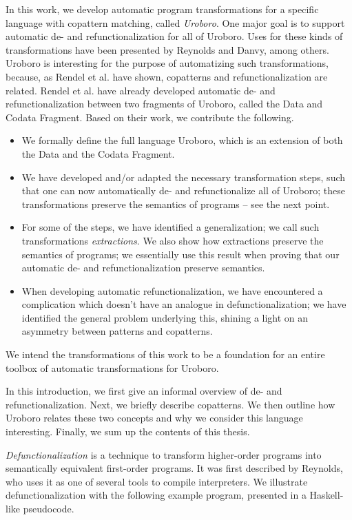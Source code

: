 In this work, we develop automatic program transformations for a specific language with copattern matching, called \textit{Uroboro}. One major goal is to support automatic de- and refunctionalization for all of Uroboro. Uses for these kinds of transformations have been presented by Reynolds and Danvy, among others. Uroboro is interesting for the purpose of automatizing such transformations, because, as Rendel et al.\cite{rendel15automatic} have shown, copatterns and refunctionalization are related. Rendel et al. have already developed automatic de- and refunctionalization between two fragments of Uroboro, called the Data and Codata Fragment. Based on their work, we contribute the following.
\begin{itemize}
\item We formally define the full language Uroboro, which is an extension of both the Data and the Codata Fragment.

\item We have developed and/or adapted the necessary transformation steps, such that one can now automatically de- and refunctionalize all of Uroboro; these transformations preserve the semantics of programs -- see the next point.

\item For some of the steps, we have identified a generalization; we call such transformations \textit{extractions}. We also show how extractions preserve the semantics of programs; we essentially use this result when proving that our automatic de- and refunctionalization preserve semantics.

\item When developing automatic refunctionalization, we have encountered a complication which doesn't have an analogue in defunctionalization; we have identified the general problem underlying this, shining a light on an asymmetry between patterns and copatterns.
\end{itemize}
We intend the transformations of this work to be a foundation for an entire toolbox of automatic transformations for Uroboro.

In this introduction, we first give an informal overview of de- and refunctionalization. Next, we briefly describe copatterns. We then outline how Uroboro relates these two concepts and why we consider this language interesting. Finally, we sum up the contents of this thesis.

\textit{Defunctionalization} is a technique to transform higher-order programs into semantically equivalent first-order programs. It was first described by Reynolds\cite{reynolds72definitional}, who uses it as one of several tools to compile interpreters. We illustrate defunctionalization with the following example program, presented in a Haskell-like pseudocode.

